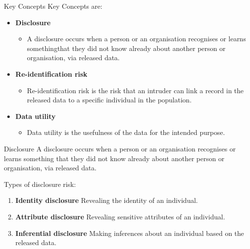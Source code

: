 \documentclass[
  ignorenonframetext,
  aspectratio=169,
]{beamer}
\providecommand{\tightlist}{%
  \setlength{\itemsep}{0pt}\setlength{\parskip}{0pt}}\usepackage{longtable,booktabs,array}
\begin{document}
\begin{frame}{Key Concepts}
\label{key-concepts}
Key Concepts are:

\begin{itemize}
\tightlist
\item
  \textbf{Disclosure}

  \begin{itemize}
  \tightlist
  \item
    A disclosure occurs when a person or an organisation recognises or
    learns somethingthat they did not know already about another person
    or organisation, via released data.
  \end{itemize}
\end{itemize}

\pause

\begin{itemize}
\tightlist
\item
  \textbf{Re-identification risk}

  \begin{itemize}
  \tightlist
  \item
    Re-identification risk is the risk that an intruder can link a
    record in the released data to a specific individual in the
    population.
  \end{itemize}
\end{itemize}

\pause

\begin{itemize}
\tightlist
\item
  \textbf{Data utility}

  \begin{itemize}
  \tightlist
  \item
    Data utility is the usefulness of the data for the intended purpose.
  \end{itemize}
\end{itemize}
\end{frame}

\begin{frame}{Disclosure}
\label{disclosure}
A disclosure occurs when a person or an organisation recognises or
learns something that they did not know already about another person or
organisation, via released data.

Types of disclosure risk:

\begin{enumerate}
[(1)]
\tightlist
\item
  \textbf{Identity disclosure} Revealing the identity of an individual.
  \vspace{0.5cm}
\item
  \textbf{Attribute disclosure} Revealing sensitive attributes of an
  individual. \vspace{0.5cm}
\item
  \textbf{Inferential disclosure} Making inferences about an individual
  based on the released data.
\end{enumerate}
\end{frame}
\end{document}
